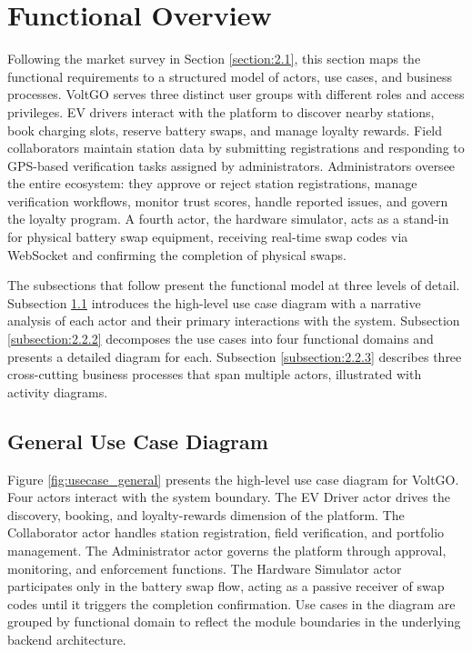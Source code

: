 \documentclass[../Main.tex]{subfiles}
\begin{document}
\section{Functional Overview}
\label{section:2.2}
Following the market survey in Section \ref{section:2.1}, this section maps the functional requirements to a structured model of actors, use cases, and business processes. VoltGO serves three distinct user groups with different roles and access privileges. EV drivers interact with the platform to discover nearby stations, book charging slots, reserve battery swaps, and manage loyalty rewards. Field collaborators maintain station data by submitting registrations and responding to GPS-based verification tasks assigned by administrators. Administrators oversee the entire ecosystem: they approve or reject station registrations, manage verification workflows, monitor trust scores, handle reported issues, and govern the loyalty program. A fourth actor, the hardware simulator, acts as a stand-in for physical battery swap equipment, receiving real-time swap codes via WebSocket and confirming the completion of physical swaps.

The subsections that follow present the functional model at three levels of detail. Subsection \ref{subsection:2.2.1} introduces the high-level use case diagram with a narrative analysis of each actor and their primary interactions with the system. Subsection \ref{subsection:2.2.2} decomposes the use cases into four functional domains and presents a detailed diagram for each. Subsection \ref{subsection:2.2.3} describes three cross-cutting business processes that span multiple actors, illustrated with activity diagrams.

\subsection{General Use Case Diagram}
\label{subsection:2.2.1}
Figure \ref{fig:usecase_general} presents the high-level use case diagram for VoltGO. Four actors interact with the system boundary. The EV Driver actor drives the discovery, booking, and loyalty-rewards dimension of the platform. The Collaborator actor handles station registration, field verification, and portfolio management. The Administrator actor governs the platform through approval, monitoring, and enforcement functions. The Hardware Simulator actor participates only in the battery swap flow, acting as a passive receiver of swap codes until it triggers the completion confirmation. Use cases in the diagram are grouped by functional domain to reflect the module boundaries in the underlying backend architecture.
\end{document}
